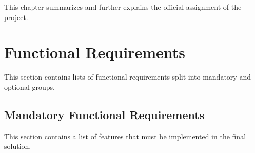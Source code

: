 
This chapter summarizes and further explains the official assignment of the
project.

\section{Functional Requirements}

This section contains lists of functional requirements split into mandatory
and optional groups.

\subsection{Mandatory Functional Requirements}

This section contains a list of features that must be implemented in the final
solution.

